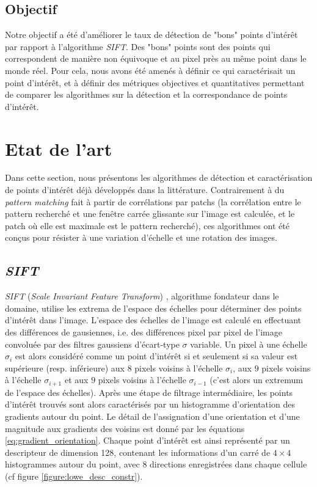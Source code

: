 \documentclass[
	a4paper, %
	10pt, %
	unnumberedsections, %
	twoside, %
]{LTJournalArticle}
\begin{document}
\subsection{Objectif}

Notre objectif a été d'améliorer le taux de détection de "bons" points d'intérêt par rapport à l'algorithme \textit{SIFT}. Des "bons" points sont des points qui correspondent de manière non équivoque et au pixel près au même point dans le monde réel.
Pour cela, nous avons été amenés à définir ce qui caractérisait un point d'intérêt, et à définir des métriques objectives et quantitatives permettant de comparer les algorithmes sur la détection et la correspondance de points d'intérêt.

\section{Etat de l'art}

Dans cette section, nous présentons les algorithmes de détection et caractérisation de points d'intérêt déjà développés dans la littérature.
Contrairement à du \textit{pattern matching} fait à partir de corrélations par patchs (la corrélation entre le pattern recherché et une fenêtre carrée glissante sur l'image est calculée, et le patch où elle est maximale est le pattern recherché), ces algorithmes ont été conçus pour résister à une variation d'échelle et une rotation des images.

\subsection{\textit{SIFT}}

\textit{SIFT} (\textit{Scale Invariant Feature Transform}) \autocite{Lowe:2004}, algorithme fondateur dans le domaine, utilise les extrema de l'espace des échelles pour déterminer des points d'intérêt dans l'image.
L'espace des échelles de l'image est calculé en effectuant des différences de gausiennes, i.e. des différences pixel par pixel de l'image convoluée par des filtres gaussiens d'écart-type $\sigma$ variable.
Un pixel à une échelle $\sigma_i$ est alors considéré comme un point d'intérêt si et seulement si sa valeur est supérieure (resp. inférieure) aux $8$ pixels voisins à l'échelle $\sigma_i$, aux $9$ pixels voisins à l'échelle $\sigma_{i+1}$ et aux $9$ pixels voisins à l'échelle $\sigma_{i-1}$ (c'est alors un extremum de l'espace des échelles).
Après une étape de filtrage intermédiaire, les points d'intérêt trouvés sont alors caractérisés par un histogramme d'orientation des gradients autour du point.
Le détail de l'assignation d'une orientation et d'une magnitude aux gradients des voisins est donné par les équations \ref{eq:gradient_orientation}.
Chaque point d'intérêt est ainsi représenté par un descripteur de dimension 128, contenant les informations d'un carré de
$4 \times 4$ histogrammes autour du point, avec $8$ directions enregistrées dans chaque cellule (cf figure \ref{figure:lowe_desc_constr}).
\end{document}
